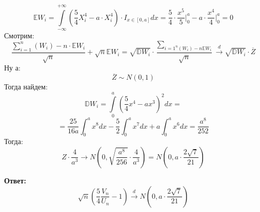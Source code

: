 \documentclass[a4paper,12pt]{article}
\begin{document}
\[
\mathbb{E}W_i= \int\limits_{-\infty}^{+\infty} \left(
\frac{5}{4}X_i^4 - a \cdot X_i^4 
\right)
\cdot I_{x \in [0, a]} dx=
\frac{5}{4} \cdot \frac{x^5}{5} \Bigg|_0^a - a \cdot \frac{x^4}{4} \Bigg|_0^a = 0
\]
Смотрим:
\[
\frac{\sum_{i = 1}^n \left(W_i \right)- n \cdot \mathbb{E} W_i }{\sqrt{n}} + \sqrt{n} \mathbb{E} W_i = \sqrt{\mathbb{D}W_i} \cdot \frac{\sum_{i =1^n \left(W_i\right) - n \mathbb{E}W_i }}{\sqrt{n}} \overset{d}{\longrightarrow} \sqrt{\mathbb{D}W_i} \cdot \overline{Z} 
\]
Ну а:
\[
\overline{Z}  \sim N(0, 1)
\]
Тогда найдем:
\[
\mathbb{D}W_i  = \int\limits_0^a \left(
\frac{5}{4} x^4 - ax^3 
\right)^2dx = 
\]
\[
=
\frac{25}{16a} \int_0^a x^8dx - \frac{5}{2} \int_0^a x^7 dx + a \int_0^a x^6 dx = \frac{a^8}{252}
\]
Тогда:
\[
Z \cdot \frac{4}{a^3} \rightarrow 
N
\left(
0, \sqrt{\frac{a^8}{256}} \cdot \frac{4}{a^3} 
\right)
=
N
\left(
0, a \cdot \frac{2\sqrt{7}}{21}
\right)
\]
\begin{center}
\textbf{Ответ: } 
\[
\sqrt{n}
 \left(
\frac{5}{4}
\frac{V_n}{U_n} - 1
\right)
\overset{d}{\longrightarrow}
N
\left(
0, a \cdot \frac{2\sqrt{7}}{21}
\right)
\]
\end{center}
\end{document}
